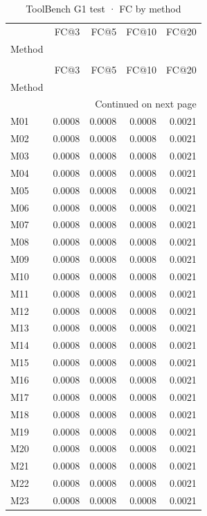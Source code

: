 \begin{longtable}{lrrrr}
\caption{ToolBench G1 test · FC by method} \label{tab:ToolBench-G1-test-family-family-fullcoverage} \\
\toprule
 & FC@3 & FC@5 & FC@10 & FC@20 \\
Method &  &  &  &  \\
\midrule
\endfirsthead
\caption[]{ToolBench G1 test · FC by method} \\
\toprule
 & FC@3 & FC@5 & FC@10 & FC@20 \\
Method &  &  &  &  \\
\midrule
\endhead
\midrule
\multicolumn{5}{r}{Continued on next page} \\
\midrule
\endfoot
\bottomrule
\endlastfoot
M01 & 0.0008 & 0.0008 & 0.0008 & 0.0021 \\
M02 & 0.0008 & 0.0008 & 0.0008 & 0.0021 \\
M03 & 0.0008 & 0.0008 & 0.0008 & 0.0021 \\
M04 & 0.0008 & 0.0008 & 0.0008 & 0.0021 \\
M05 & 0.0008 & 0.0008 & 0.0008 & 0.0021 \\
M06 & 0.0008 & 0.0008 & 0.0008 & 0.0021 \\
M07 & 0.0008 & 0.0008 & 0.0008 & 0.0021 \\
M08 & 0.0008 & 0.0008 & 0.0008 & 0.0021 \\
M09 & 0.0008 & 0.0008 & 0.0008 & 0.0021 \\
M10 & 0.0008 & 0.0008 & 0.0008 & 0.0021 \\
M11 & 0.0008 & 0.0008 & 0.0008 & 0.0021 \\
M12 & 0.0008 & 0.0008 & 0.0008 & 0.0021 \\
M13 & 0.0008 & 0.0008 & 0.0008 & 0.0021 \\
M14 & 0.0008 & 0.0008 & 0.0008 & 0.0021 \\
M15 & 0.0008 & 0.0008 & 0.0008 & 0.0021 \\
M16 & 0.0008 & 0.0008 & 0.0008 & 0.0021 \\
M17 & 0.0008 & 0.0008 & 0.0008 & 0.0021 \\
M18 & 0.0008 & 0.0008 & 0.0008 & 0.0021 \\
M19 & 0.0008 & 0.0008 & 0.0008 & 0.0021 \\
M20 & 0.0008 & 0.0008 & 0.0008 & 0.0021 \\
M21 & 0.0008 & 0.0008 & 0.0008 & 0.0021 \\
M22 & 0.0008 & 0.0008 & 0.0008 & 0.0021 \\
M23 & 0.0008 & 0.0008 & 0.0008 & 0.0021 \\

\end{longtable}
